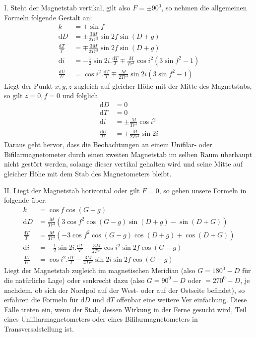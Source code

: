I. Steht der Magnetstab vertikal, gilt also $F=\pm90^0$, so nehmen die allgemeinen Formeln folgende Gestalt an:
\[
\begin{aligned}
k&=\pm\sin f\\
\mathrm{d}D&=\pm\frac{3M}{2Tr^3}\sin2f\sin(D+g)\\
\frac{\mathrm{d}T}{T}&=\mp\frac{3M}{2Tr^3}\sin2f\sin(D+g)\\
\mathrm{d}i&=-\tfrac12\sin2i.\frac{\mathrm{d}T}{T}\mp\frac{M}{Tr^3}\cos i^2(3\sin f^2-1)\\
\frac{\mathrm{d}U}{U}&=\cos i^2.\frac{\mathrm{d}T}{T}\mp\frac{M}{2Tr^3}\sin2i(3\sin f^2-1)
\end{aligned}
\]
Liegt der Punkt $x,y,z$ zugleich auf gleicher Höhe mit der Mitte des Magnetstabs, so gilt $z=0,f=0$ und folglich
\[
\begin{aligned}
\mathrm{d}D&=0\\
\mathrm{d}T&=0\\
\mathrm{d}i&=\pm\frac{M}{Tr^3}\cos i^2\\
\frac{\mathrm{d}U}{U}&=\pm\frac{M}{2Tr^3}\sin2i
\end{aligned}
\]
Daraus geht hervor, dass die Beobachtungen an einem Unifilar- oder Bifilarmagnetometer durch einen zweiten Magnetstab im selben Raum überhaupt nicht gestört werden, solange dieser vertikal gehalten wird und seine Mitte auf gleicher Höhe mit dem Stab des Magnetometers bleibt.

II. Liegt der Magnetstab horizontal oder gilt $F=0$, so gehen unsere Formeln in folgende über:
\[
\begin{aligned}
k&=\cos f\cos(G-g)\\
\mathrm{d}D&=\frac{M}{Tr^3}(3\cos f^2\cos(G-g)\sin(D+g)-\sin(D+G))\\
\frac{\mathrm{d}T}{T}&=\frac{M}{Tr^3}(-3\cos f^2\cos(G-g)\cos(D+g)+\cos(D+G))\\
\mathrm{d}i&=-\tfrac12\sin2i.\frac{\mathrm{d}T}{T}-\frac{3M}{2Tr^3}\cos i^2\sin2f\cos(G-g)\\
\frac{\mathrm{d}U}{U}&=\cos i^2.\frac{\mathrm{d}T}{T}-\frac{3M}{4Tr^3}\sin2i\sin2f\cos(G-g)
\end{aligned}
\]
Liegt der Magnetstab zugleich im magnetischen Meridian (also $G=180^0-D$ für die natürliche Lage) oder senkrecht dazu (also $G=90^0-D$ oder $=270^0-D$, je nachdem, ob sich der Nordpol auf der West- oder auf der Ostseite befindet), so erfahren die Formeln für $\mathrm{d}D$ und $\mathrm{d}T$ offenbar eine weitere Ver%
einfachung. Diese Fälle treten ein, wenn der Stab, dessen Wirkung in der Ferne gesucht wird, Teil eines Unifilarmagnetometers oder eines Bifilarmagnetometers in Transversalstellung ist.

